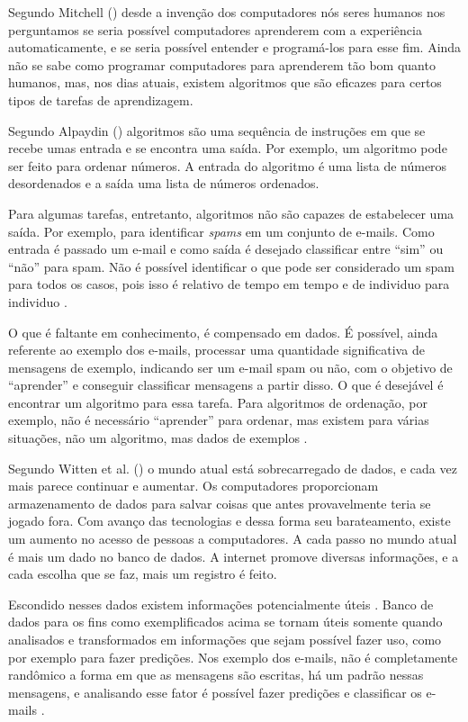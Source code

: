 Segundo Mitchell (\citeyear{Mitchell:1997:ML:541177}) desde a invenção dos computadores nós seres humanos nos perguntamos se seria possível computadores aprenderem com a experiência automaticamente, e se seria possível entender e programá-los para esse fim. Ainda não se sabe como programar computadores para aprenderem tão bom quanto humanos, mas, nos dias atuais, existem algoritmos que são eficazes para certos tipos de tarefas de aprendizagem. 

Segundo Alpaydin (\citeyear{Alpaydin:2010:IML:1734076}) algoritmos são uma sequência de instruções em que se recebe umas entrada e se encontra uma saída. Por exemplo, um algoritmo pode ser feito para ordenar números. A entrada do algoritmo é uma lista de números desordenados e a saída uma lista de números ordenados.

Para algumas tarefas, entretanto, algoritmos não são capazes de estabelecer uma saída. Por exemplo, para identificar \textit{spams} em um conjunto de e-mails. Como entrada é passado um e-mail e como saída é desejado classificar entre “sim” ou “não” para spam. Não é possível identificar o que pode ser considerado um spam para todos os casos, pois isso é relativo de tempo em tempo e de individuo para individuo \cite{Alpaydin:2010:IML:1734076}.

O que é faltante em conhecimento, é compensado em dados. É possível, ainda referente ao exemplo dos e-mails, processar uma quantidade significativa de mensagens de exemplo, indicando ser um e-mail spam ou não, com o objetivo de “aprender” e conseguir classificar mensagens a partir disso. O que é desejável é encontrar um algoritmo para essa tarefa. Para algoritmos de ordenação, por exemplo, não é necessário “aprender” para ordenar, mas existem para várias situações, não um algoritmo, mas dados de exemplos \cite{Alpaydin:2010:IML:1734076}.


Segundo Witten et al. (\citeyear{Witten:2016:DMF:3086818}) o mundo atual está sobrecarregado de dados, e cada vez mais parece continuar e aumentar. Os computadores proporcionam armazenamento de dados para salvar coisas que antes provavelmente teria se jogado fora. Com avanço das tecnologias e dessa forma seu barateamento, existe um aumento no acesso de pessoas a computadores. A cada passo no mundo atual é mais um dado no banco de dados. A internet promove diversas informações, e a cada escolha que se faz, mais um registro é feito.	

Escondido nesses dados existem informações potencialmente úteis \cite{Witten:2016:DMF:3086818}. Banco de dados para os fins como exemplificados acima se tornam úteis somente quando analisados e transformados em informações que sejam possível fazer uso, como por exemplo para fazer predições. Nos exemplo dos e-mails, não é completamente randômico a forma em que as mensagens são escritas, há um padrão nessas mensagens, e analisando esse fator é possível fazer predições e classificar os e-mails \cite{Alpaydin:2010:IML:1734076}.

